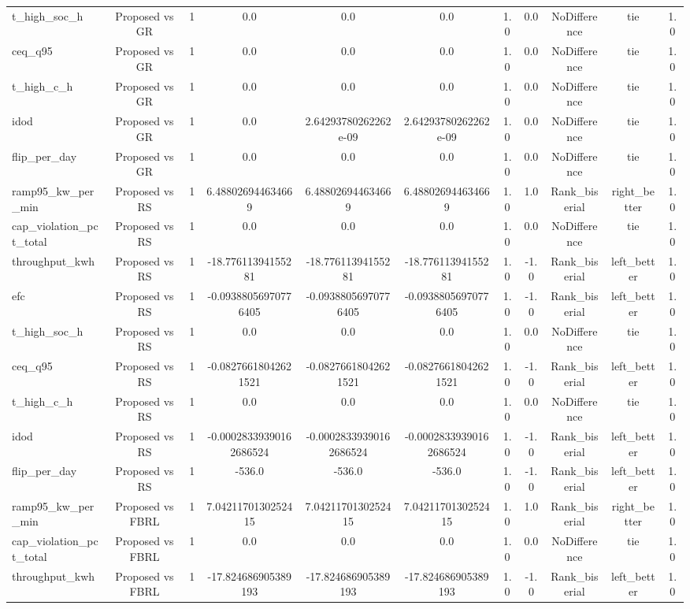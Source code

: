 \begin{table}[t]
\begin{tabular}{lcccccccccc}
t\_high\_soc\_h & Proposed vs GR & 1 & 0.0 & 0.0 & 0.0 & 1.0 & 0.0 & NoDifference & tie & 1.0 \\
ceq\_q95 & Proposed vs GR & 1 & 0.0 & 0.0 & 0.0 & 1.0 & 0.0 & NoDifference & tie & 1.0 \\
t\_high\_c\_h & Proposed vs GR & 1 & 0.0 & 0.0 & 0.0 & 1.0 & 0.0 & NoDifference & tie & 1.0 \\
idod & Proposed vs GR & 1 & 0.0 & 2.64293780262262e-09 & 2.64293780262262e-09 & 1.0 & 0.0 & NoDifference & tie & 1.0 \\
flip\_per\_day & Proposed vs GR & 1 & 0.0 & 0.0 & 0.0 & 1.0 & 0.0 & NoDifference & tie & 1.0 \\
ramp95\_kw\_per\_min & Proposed vs RS & 1 & 6.488026944634669 & 6.488026944634669 & 6.488026944634669 & 1.0 & 1.0 & Rank\_biserial & right\_better & 1.0 \\
cap\_violation\_pct\_total & Proposed vs RS & 1 & 0.0 & 0.0 & 0.0 & 1.0 & 0.0 & NoDifference & tie & 1.0 \\
throughput\_kwh & Proposed vs RS & 1 & -18.77611394155281 & -18.77611394155281 & -18.77611394155281 & 1.0 & -1.0 & Rank\_biserial & left\_better & 1.0 \\
efc & Proposed vs RS & 1 & -0.09388056970776405 & -0.09388056970776405 & -0.09388056970776405 & 1.0 & -1.0 & Rank\_biserial & left\_better & 1.0 \\
t\_high\_soc\_h & Proposed vs RS & 1 & 0.0 & 0.0 & 0.0 & 1.0 & 0.0 & NoDifference & tie & 1.0 \\
ceq\_q95 & Proposed vs RS & 1 & -0.08276618042621521 & -0.08276618042621521 & -0.08276618042621521 & 1.0 & -1.0 & Rank\_biserial & left\_better & 1.0 \\
t\_high\_c\_h & Proposed vs RS & 1 & 0.0 & 0.0 & 0.0 & 1.0 & 0.0 & NoDifference & tie & 1.0 \\
idod & Proposed vs RS & 1 & -0.00028339390162686524 & -0.00028339390162686524 & -0.00028339390162686524 & 1.0 & -1.0 & Rank\_biserial & left\_better & 1.0 \\
flip\_per\_day & Proposed vs RS & 1 & -536.0 & -536.0 & -536.0 & 1.0 & -1.0 & Rank\_biserial & left\_better & 1.0 \\
ramp95\_kw\_per\_min & Proposed vs FBRL & 1 & 7.0421170130252415 & 7.0421170130252415 & 7.0421170130252415 & 1.0 & 1.0 & Rank\_biserial & right\_better & 1.0 \\
cap\_violation\_pct\_total & Proposed vs FBRL & 1 & 0.0 & 0.0 & 0.0 & 1.0 & 0.0 & NoDifference & tie & 1.0 \\
throughput\_kwh & Proposed vs FBRL & 1 & -17.824686905389193 & -17.824686905389193 & -17.824686905389193 & 1.0 & -1.0 & Rank\_biserial & left\_better & 1.0 \\

\end{tabular}
\end{table}

